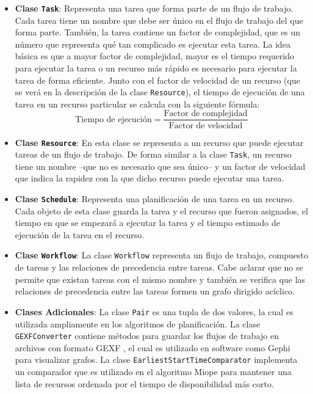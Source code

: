 \begin{itemize}

\item{\textbf{Clase \texttt{Task}}: Representa una tarea que forma parte de un flujo de trabajo. Cada tarea tiene un nombre que debe ser único en el flujo de trabajo del que forma parte. También, la tarea contiene un factor de complejidad, que es un número que representa qué tan complicado es ejecutar esta tarea. La idea básica es que a mayor factor de complejidad, mayor es el tiempo requerido para ejecutar la tarea o un recurso más rápido es necesario para ejecutar la tarea de forma eficiente. Junto con el factor de velocidad de un recurso (que se verá en la descripción de la clase \texttt{Resource}), el tiempo de ejecución de una tarea en un recurso particular se calcula con la siguiente fórmula:
\begin{equation}
  \text{Tiempo de ejecución} = \frac{\text{Factor de complejidad}}{\text{Factor de velocidad}}
\end{equation}}

\item \textbf{Clase \texttt{Resource}}: En esta clase se representa a un recurso que puede ejecutar tareas de un flujo de trabajo. De forma similar a la clase \texttt{Task}, un recurso tiene un nombre --que no es necesario que sea único-- y un factor de velocidad que indica la rapidez con la que dicho recurso puede ejecutar una tarea.

\item \textbf{Clase \texttt{Schedule}}: Representa una planificación de una tarea en un recurso. Cada objeto de esta clase guarda la tarea y el recurso que fueron asignados, el tiempo en que se empezará a ejecutar la tarea y el tiempo estimado de ejecución de la tarea en el recurso.

\item \textbf{Clase \texttt{Workflow}}: La clase \texttt{Workflow} representa un flujo de trabajo, compuesto de tareas y las relaciones de precedencia entre tareas. Cabe aclarar que no se permite que existan tareas con el mismo nombre y también se verifica que las relaciones de precedencia entre las tareas formen un grafo dirigido acíclico.

\item \textbf{Clases Adicionales}: La clase \texttt{Pair} es una tupla de dos valores, la cual es utilizada ampliamente en los algoritmos de planificación. La clase \texttt{GEXFConverter} contiene métodos para guardar los flujos de trabajo en archivos con formato GEXF \cite{gexf2014}, el cual es utilizado en software como Gephi \cite{bastian2009gephi} para visualizar grafos. La clase \texttt{EarliestStartTimeComparator} implementa un comparador que es utilizado en el algoritmo Miope para mantener una lista de recursos ordenada por el tiempo de disponibilidad más corto.
\end{itemize}


